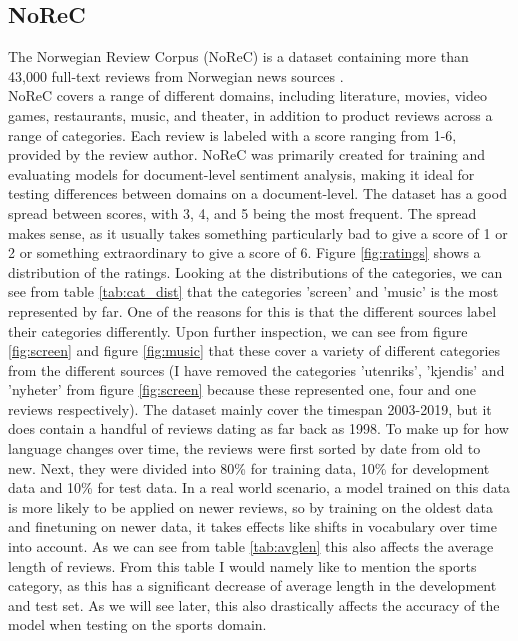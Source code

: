 \subsection{NoReC} \label{NoReC}
The Norwegian Review Corpus (NoReC) is a dataset containing more than 43,000 full-text reviews from Norwegian news sources \cite{VelOvrBer18}.\\
NoReC covers a range of different domains, including literature, movies, video games, restaurants, music, and theater, in addition to product reviews across a range of categories. Each review is labeled with a score ranging from 1-6, provided by the review author. NoReC was primarily created for training and evaluating models for document-level sentiment analysis, making it ideal for testing differences between domains on a document-level. The dataset has a good spread between scores, with 3, 4, and 5 being the most frequent. The spread makes sense, as it usually takes something particularly bad to give a score of 1 or 2 or something extraordinary to give a score of 6. Figure \ref{fig:ratings} shows a distribution of the ratings. Looking at the distributions of the categories, we can see from table \ref{tab:cat_dist} that the categories 'screen' and 'music' is the most represented by far. One of the reasons for this is that the different sources label their categories differently. Upon further inspection, we can see from figure \ref{fig:screen} and figure \ref{fig:music} that these cover a variety of different categories from the different sources (I have removed the categories 'utenriks', 'kjendis' and 'nyheter' from figure \ref{fig:screen} because these represented one, four and one reviews respectively). The dataset mainly cover the timespan 2003-2019, but it does contain a handful of reviews dating as far back as 1998. To make up for how language changes over time, the reviews were first sorted by date from old to new. Next, they were divided into 80\% for training data, 10\% for development data and 10\% for test data. In a real world scenario, a model trained on this data is more likely to be applied on newer reviews, so by training on the oldest data and finetuning on newer data, it takes effects like shifts in vocabulary over time into account. As we can see from table \ref{tab:avglen} this also affects the average length of reviews. From this table I would namely like to mention the sports category, as this has a significant decrease of average length in the development and test set. As we will see later, this also drastically affects the accuracy of the model when testing on the sports domain.

